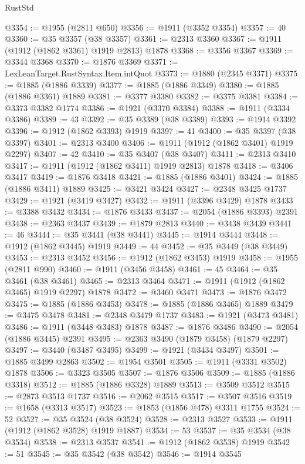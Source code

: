 \begin{lexlean}{RustStd}
\begin{coremodule}
{\begin{coremodule}
{{{{{{{{{{{{{{{{{{{{{{{{{{{{{@3354 := @1955 (@2811 @650)
@3356 := @1911 (@3352 @3354)
@3357 := 40
@3360 := @35 @3357 (@38 @3357)
@3361 := @2313 @3360
@3367 := @1911 (@1912 (@1862 @3361) @1919 @2813) @1878
@3368 := @3356 @3367
@3369 := @3344 @3368
@3370 := @1876 @3369
@3371 := LexLeanTarget.RustSyntax.Item.intQuot
@3373 := @1880 (@2345 @3371)
@3375 := @1885 (@1886 @3339)
@3377 := @1885 (@1886 @3349)
@3380 := @1885 (@1886 @3361) @1889
@3381 := @3377 @3380
@3382 := @3375 @3381
@3384 := @3373 @3382 @1774
@3386 := @1921 (@3370 @3384)
@3388 := @1911 (@3334 @3386)
@3389 := 43
@3392 := @35 @3389 (@38 @3389)
@3393 := @1914 @3392
@3396 := @1912 (@1862 @3393) @1919
@3397 := 41
@3400 := @35 @3397 (@38 @3397)
@3401 := @2313 @3400
@3406 := @1911 (@1912 (@1862 @3401) @1919 @2297)
@3407 := 42
@3410 := @35 @3407 (@38 @3407)
@3411 := @2313 @3410
@3417 := @1911 (@1912 (@1862 @3411) @1919 @2813) @1878
@3418 := @3406 @3417
@3419 := @1876 @3418
@3421 := @1885 (@1886 @3401)
@3424 := @1885 (@1886 @3411) @1889
@3425 := @3421 @3424
@3427 := @2348 @3425 @1737
@3429 := @1921 (@3419 @3427)
@3432 := @1911 (@3396 @3429) @1878
@3433 := @3388 @3432
@3434 := @1876 @3433
@3437 := @2054 (@1886 @3393) @2391
@3438 := @2363 @3437
@3439 := @1879 @2813
@3440 := @3438 @3439
@3441 := 46
@3444 := @35 @3441 (@38 @3441)
@3445 := @1914 @3444
@3448 := @1912 (@1862 @3445) @1919
@3449 := 44
@3452 := @35 @3449 (@38 @3449)
@3453 := @2313 @3452
@3456 := @1912 (@1862 @3453) @1919
@3458 := @1955 (@2811 @990)
@3460 := @1911 (@3456 @3458)
@3461 := 45
@3464 := @35 @3461 (@38 @3461)
@3465 := @2313 @3464
@3471 := @1911 (@1912 (@1862 @3465) @1919 @2297) @1878
@3472 := @3460 @3471
@3473 := @1876 @3472
@3475 := @1885 (@1886 @3453)
@3478 := @1885 (@1886 @3465) @1889
@3479 := @3475 @3478
@3481 := @2348 @3479 @1737
@3483 := @1921 (@3473 @3481)
@3486 := @1911 (@3448 @3483) @1878
@3487 := @1876 @3486
@3490 := @2054 (@1886 @3445) @2391
@3495 := @2363 @3490 (@1879 @3458) (@1879 @2297)
@3497 := @3440 (@3487 @3495)
@3499 := @1921 (@3434 @3497)
@3501 := @1885 @3499 @2863
@3502 := @1954 @3501
@3505 := @1911 (@3331 @3502) @1878
@3506 := @3323 @3505
@3507 := @1876 @3506
@3509 := @1885 (@1886 @3318)
@3512 := @1885 (@1886 @3328) @1889
@3513 := @3509 @3512
@3515 := @2873 @3513 @1737
@3516 := @2062 @3515
@3517 := @3507 @3516
@3519 := @1658 (@3313 @3517)
@3523 := @1853 (@1856 @478) @3311 @1755
@3524 := 52
@3527 := @35 @3524 (@38 @3524)
@3528 := @2313 @3527
@3533 := @1911 (@1912 (@1862 @3528) @1919 @1887)
@3534 := 53
@3537 := @35 @3534 (@38 @3534)
@3538 := @2313 @3537
@3541 := @1912 (@1862 @3538) @1919
@3542 := 51
@3545 := @35 @3542 (@38 @3542)
@3546 := @1914 @3545
}}}}}}}}}}}}}}}}}}}}}}}}}}}}}
\end{coremodule}}
\end{coremodule}
\end{lexlean}

